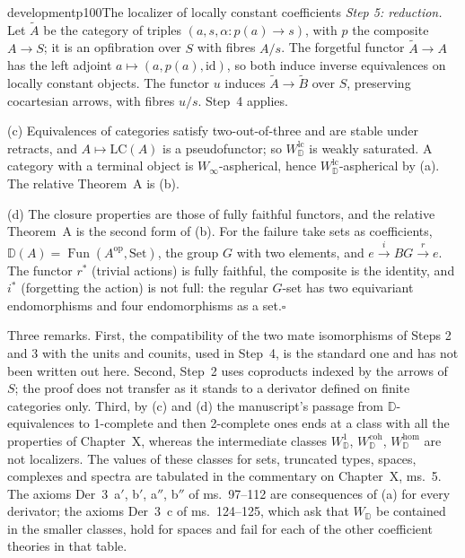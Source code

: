 \begin{dcomment}{development}{p100}{The localizer of locally constant coefficients}
\emph{Step 5: reduction.} Let $\widetilde A$ be the category of triples $(a,s,\alpha:p(a)\to s)$, with $p$ the composite $A\to S$; it is an opfibration over $S$ with fibres $A/s$. The forgetful functor $\widetilde A\to A$ has the left adjoint $a\mapsto(a,p(a),\mathrm{id})$, so both induce inverse equivalences on locally constant objects. The functor $u$ induces $\widetilde A\to\widetilde B$ over $S$, preserving cocartesian arrows, with fibres $u/s$. Step~4 applies.

(c) Equivalences of categories satisfy two-out-of-three and are stable under retracts, and $A\mapsto\mathrm{LC}(A)$ is a pseudofunctor; so $W^{\mathrm{lc}}_{\mathbb D}$ is weakly saturated. A category with a terminal object is $W_\infty$-aspherical, hence $W^{\mathrm{lc}}_{\mathbb D}$-aspherical by (a). The relative Theorem~A is (b).

(d) The closure properties are those of fully faithful functors, and the relative Theorem~A is the second form of (b). For the failure take sets as coefficients, $\mathbb D(A)=\operatorname{Fun}(A^{\mathrm{op}},\mathrm{Set})$, the group $G$ with two elements, and $e\xrightarrow{i}BG\xrightarrow{r}e$. The functor $r^*$ (trivial actions) is fully faithful, the composite is the identity, and $i^*$ (forgetting the action) is not full: the regular $G$-set has two equivariant endomorphisms and four endomorphisms as a set.\hfill$\square$

Three remarks. First, the compatibility of the two mate isomorphisms of Steps 2 and 3 with the units and counits, used in Step~4, is the standard one and has not been written out here. Second, Step~2 uses coproducts indexed by the arrows of $S$; the proof does not transfer as it stands to a derivator defined on finite categories only. Third, by (c) and (d) the manuscript's passage from $\mathbb D$-equivalences to 1-complete and then 2-complete ones ends at a class with all the properties of Chapter~X, whereas the intermediate classes $W^1_{\mathbb D}$, $W^{\mathrm{coh}}_{\mathbb D}$, $W^{\mathrm{hom}}_{\mathbb D}$ are not localizers. The values of these classes for sets, truncated types, spaces, complexes and spectra are tabulated in the commentary on Chapter~X, ms.~5. The axioms Der~3~a$'$, b$'$, a$''$, b$''$ of ms.~97--112 are consequences of (a) for every derivator; the axioms Der~3~c of ms.~124--125, which ask that $W_{\mathbb D}$ be contained in the smaller classes, hold for spaces and fail for each of the other coefficient theories in that table.
\end{dcomment}

